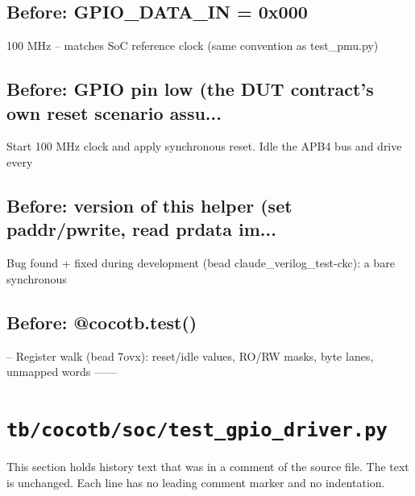 \begin{record}

\subsection*{Before: GPIO\_DATA\_IN = 0x000}

\begin{textblock}
100 MHz -- matches SoC reference clock (same convention as test_pmu.py)
\end{textblock}

\subsection*{Before: GPIO pin low (the DUT contract's own reset scenario assu...}

\begin{textblock}
Start 100 MHz clock and apply synchronous reset. Idle the APB4 bus and drive every
\end{textblock}

\subsection*{Before: version of this helper (set paddr/pwrite, read prdata im...}

\begin{textblock}
Bug found + fixed during development (bead claude_verilog_test-ckc): a bare synchronous
\end{textblock}

\subsection*{Before: @cocotb.test()}

\begin{textblock}
-- Register walk (bead 7ovx): reset/idle values, RO/RW masks, byte lanes, unmapped words ------
\end{textblock}

\end{record}

\section{\texttt{tb/cocotb/soc/test\_gpio\_driver.py}}\label{cr:suite:soc-test-gpio-driver}

This section holds history text that was in a comment of the source file. The text is unchanged. Each line has no leading comment marker and no indentation.

